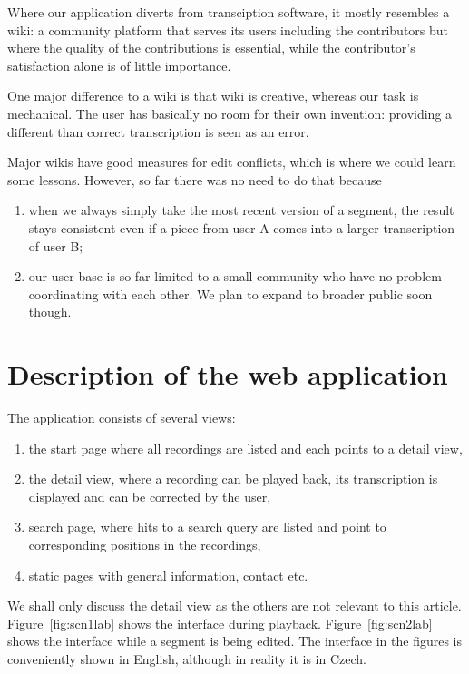 \documentclass{llncs}
\begin{document}
Where our application diverts from transciption software, it mostly resembles a
wiki: a community platform that serves its users including the contributors but
where the quality of the contributions is essential, while the contributor's
satisfaction alone is of little importance.

One major difference to a wiki is that wiki is creative, whereas our task is
mechanical. The user has basically no room for their own invention: providing a
different than correct transcription is seen as an error.

Major wikis have good measures for edit conflicts, which is where we could learn
some lessons. However, so far there was no need to do that because
\begin{enumerate}
\item{when we always simply take the most recent version
of a segment, the result stays consistent even if a piece from user A comes into
a larger transcription of user B;}
\item{our user base is so far limited to a small community who have no problem
coordinating with each other. We plan to expand to broader public soon though.}
\end{enumerate}

\section{Description of the web application}

The application consists of several views:
\begin{enumerate}
\item{the start page where all recordings are listed and each points to a detail
view,}
\item{the detail view, where a recording can be played back, its transcription
is displayed and can be corrected by the user,}
\item{search page, where hits to a search query are listed and point to
corresponding positions in the recordings,}
\item{static pages with general information, contact etc.}
\end{enumerate}

We shall only discuss the detail view as the others are not relevant to this
article. Figure~\ref{fig:scn1lab} shows the interface during playback.
Figure~\ref{fig:scn2lab} shows the interface while a segment is being edited.
The interface in the figures is conveniently shown in English, although in
reality it is in Czech.
\end{document}

